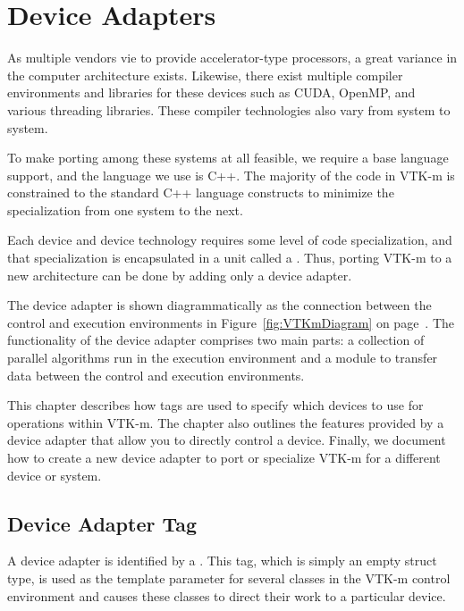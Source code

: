 
\chapter{Device Adapters}


As multiple vendors vie to provide accelerator-type processors, a great
variance in the computer architecture exists. Likewise, there exist
multiple compiler environments and libraries for these devices such as
CUDA, OpenMP, and various threading libraries. These compiler technologies
also vary from system to system.

To make porting among these systems at all feasible, we require a base
language support, and the language we use is C++. The majority of the code
in VTK-m is constrained to the standard C++ language constructs to minimize
the specialization from one system to the next.

Each device and device technology requires some level of code
specialization, and that specialization is encapsulated in a unit called a
. Thus, porting VTK-m to a new architecture can be
done by adding only a device adapter.

The device adapter is shown diagrammatically as the connection between the
control and execution environments in Figure~\ref{fig:VTKmDiagram} on
page~\pageref{fig:VTKmDiagram}. The functionality of the device adapter
comprises two main parts: a collection of parallel algorithms run in the
execution environment and a module to transfer data between the control and
execution environments.

This chapter describes how tags are used to specify which devices to use
for operations within VTK-m. The chapter also outlines the features provided
by a device adapter that allow you to directly control a device. Finally,
we document how to create a new device adapter to port or specialize VTK-m
for a different device or system.


\section{Device Adapter Tag}
\label{sec:DeviceAdapterTag}


A device adapter is identified by a . This tag,
which is simply an empty struct type, is used as the template parameter for
several classes in the VTK-m control environment and causes these classes
to direct their work to a particular device.

